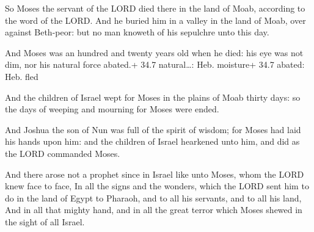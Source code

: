  So Moses the servant of the LORD died there in the land
of Moab, according to the word of the LORD.  And he buried
him in a valley in the land of Moab, over against Beth-peor: but no man
knoweth of his sepulchre unto this day.

 And Moses was an hundred and twenty years old when he
died: his eye was not dim, nor his natural force abated.+ 34.7
natural\ldots: Heb. moisture+ 34.7 abated: Heb. fled

 And the children of Israel wept for Moses in the plains
of Moab thirty days: so the days of weeping and mourning for Moses were
ended.

 And Joshua the son of Nun was full of the spirit of
wisdom; for Moses had laid his hands upon him: and the children of
Israel hearkened unto him, and did as the LORD commanded Moses.

 And there arose not a prophet since in Israel like unto
Moses, whom the LORD knew face to face,  In all the signs
and the wonders, which the LORD sent him to do in the land of Egypt to
Pharaoh, and to all his servants, and to all his land,  And
in all that mighty hand, and in all the great terror which Moses shewed
in the sight of all Israel.
